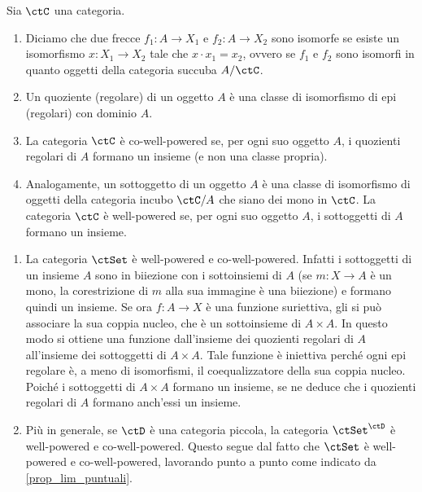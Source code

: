 \begin{definition}\label{def_cowellpow}
 Sia \(\ctC\) una categoria.
 \begin{enumerate}
  \item Diciamo che due frecce \(f_1 \colon A \to X_1\) e \(f_2 \colon A \to X_2\) sono isomorfe se esiste un isomorfismo
        \(x \colon X_1 \to X_2\) tale che \(x \cdot x_1 = x_2\), ovvero se \(f_1\) e \(f_2\) sono isomorfi in quanto oggetti della
        categoria succuba \(A/\ctC\).
  \item Un quoziente (regolare) di un oggetto \(A\) è una classe di isomorfismo di epi (regolari) con dominio \(A\).
  \item La categoria \(\ctC\) è co-well-powered se, per ogni suo oggetto \(A\), i quozienti regolari di \(A\) formano un insieme
        (e non una classe propria).
  \item Analogamente, un sottoggetto di un oggetto \(A\) è una classe di isomorfismo di oggetti della categoria incubo \(\ctC/A\)
        che siano dei mono in \(\ctC\). La categoria \(\ctC\) è well-powered se, per ogni suo oggetto \(A\), i sottoggetti di \(A\) formano
        un insieme.
 \end{enumerate}
\end{definition}

\begin{examples}\label{esempio_set_cowellpow}
 \hfill
 \begin{enumerate}
  \item La categoria \(\ctSet\) è well-powered e co-well-powered. Infatti i sottoggetti di un insieme \(A\) sono in biiezione con i
        sottoinsiemi di \(A\) (se \(m \colon X \to A\) è un mono, la corestrizione di \(m\) alla sua immagine è una biiezione) e formano
        quindi un insieme. Se ora \(f \colon A \to X\) è una funzione suriettiva, gli si può associare la sua coppia nucleo, che è un
        sottoinsieme di \(A \times A\). In questo modo si ottiene una funzione dall'insieme dei quozienti regolari di \(A\) all'insieme dei
        sottoggetti di \(A \times A\). Tale funzione è iniettiva perché ogni epi regolare \` e, a meno di isomorfismi, il coequalizzatore della sua
        coppia nucleo. Poiché i sottoggetti di \(A \times A\) formano un insieme, se ne deduce che i quozienti regolari di \(A\) formano
        anch'essi un insieme.
  \item Più in generale, se \(\ctD\) è una categoria piccola, la categoria \(\ctSet^{\ctD}\) è well-powered e co-well-powered.
        Questo segue dal fatto che \(\ctSet\) è well-powered e co-well-powered, lavorando punto a punto come indicato da \ref{prop_lim_puntuali}.
 \end{enumerate}
\end{examples}

